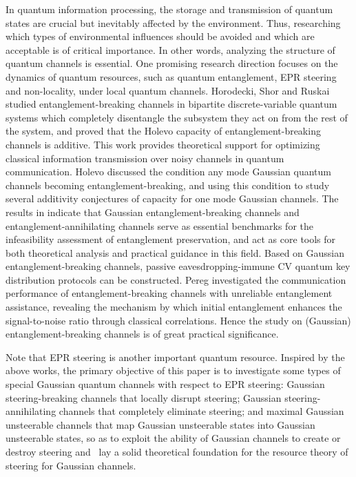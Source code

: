 \documentclass[10pt,aps,pra,amsfonts,amssymb,amsmath,%
floatfix,nofootinbib, groupedaddress,superscriptaddress,citesort,twocolumn
]{revtex4}%
\begin{document}
 In quantum information processing, the storage and transmission of quantum states are crucial but inevitably affected by the environment. Thus, researching which types of environmental influences should be avoided and which are acceptable is of critical importance. In other words, analyzing the structure of quantum channels is essential. One promising research direction focuses on the dynamics of quantum resources, such as quantum entanglement, EPR steering and  non-locality, under local quantum channels.
Horodecki, Shor and Ruskai \cite{HSR} studied
entanglement-breaking channels in bipartite discrete-variable quantum systems which completely disentangle the subsystem they act on from the rest of the system, and  proved that the Holevo capacity of entanglement-breaking channels is additive. This work provides theoretical support for optimizing classical information transmission over noisy channels in quantum communication.
Holevo \cite{HEB} discussed the condition any mode Gaussian quantum channels becoming entanglement-breaking, and  using this condition to study several additivity conjectures of capacity for one mode Gaussian channels.
The results in  \cite{KGEB} indicate that  Gaussian entanglement-breaking channels and entanglement-annihilating channels serve as essential benchmarks for the infeasibility assessment of entanglement preservation, and act as core tools for both theoretical analysis and practical guidance in this field. Based on Gaussian entanglement-breaking channels, passive eavesdropping-immune CV quantum key distribution  protocols can be constructed.
Pereg \cite{P11} investigated the communication performance of entanglement-breaking channels with unreliable entanglement assistance, revealing the mechanism by which initial entanglement enhances the signal-to-noise ratio through classical correlations.  Hence the study on (Gaussian) entanglement-breaking channels is of great practical significance.


Note that  EPR steering is another important quantum  resource. Inspired by the above works,
the primary objective of this paper is to investigate some types of special Gaussian quantum channels with respect to EPR steering: Gaussian steering-breaking channels that locally disrupt steering; Gaussian steering-annihilating channels that completely eliminate steering;  and maximal Gaussian unsteerable channels that map Gaussian unsteerable states into Gaussian unsteerable states, so as to exploit the ability of Gaussian channels to create or destroy steering and  lay a solid theoretical foundation for the resource theory of steering for Gaussian channels.\\
\end{document}

